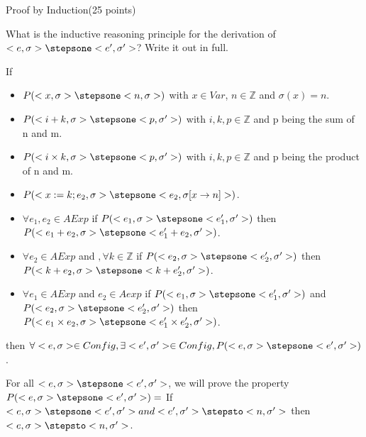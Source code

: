 \documentclass{article}
\begin{document}
%
%
%

\newpage
\begin{question}{Proof by Induction}{(25 points)}


  
  \begin{subquestion}
  	 What is the inductive reasoning principle for the derivation of $<e, \sigma> \stepsone <e', \sigma'>$? Write it out in full.
  	 
  	 If
  	 \begin{itemize}
  	 \item $P(<x, \sigma> \stepsone <n, \sigma>)$ with $x \in Var$, $n \in \mathbb{Z}$ and $\sigma(x) = n$.
   	 \item $P(<i+k, \sigma> \stepsone <p, \sigma'>)$ with $i,k,p \in \mathbb{Z}$ and p being the sum of n and m.
   	 \item $P(<i \times k, \sigma> \stepsone <p, \sigma'>)$ with $i,k,p \in \mathbb{Z}$ and p being the product of n and m.
   	 \item $P(<x := k; e_2, \sigma> \stepsone <e_2, \sigma[x \rightarrow n]>)$.
   	 \item $\forall e_1, e_2 \in AExp$ if $P(<e_1, \sigma> \stepsone <e_1', \sigma'>)$ then $P(<e_1+e_2, \sigma> \stepsone <e_1'+e_2, \sigma'>)$.
   	 \item $\forall e_2 \in AExp$ and $, \forall k \in \mathbb{Z}$ if $P(<e_2, \sigma> \stepsone <e_2', \sigma'>)$ then $P(<k+e_2, \sigma> \stepsone <k+e_2', \sigma'>)$.
   	 \item $\forall e_1 \in AExp$ and $e_2 \in Aexp$ if $P(<e_1, \sigma> \stepsone <e_1', \sigma'>)$ and $P(<e_2, \sigma> \stepsone <e_2', \sigma'>)$ then $P(<e_1 \times e_2, \sigma> \stepsone <e_1' \times e_2', \sigma'>)$.
  	 \end{itemize}
   	 then $\forall <e, \sigma> \in Config, \exists <e', \sigma'> \in Config, P(<e, \sigma> \stepsone <e', \sigma'>)$.
  	 
  	
  \end{subquestion}

  \begin{subquestion}
    For all $<e,\sigma> \stepsone <e',\sigma'>$, we will prove the property $P(<e,\sigma> \stepsone <e',\sigma'>) =$ If $<e, \sigma> \stepsone <e',\sigma'> and <e', \sigma'> \stepsto <n, \sigma'>$ then $<e, \sigma> \stepsto <n, \sigma'>$.
  \end{subquestion}


\end{question}
\end{document}
